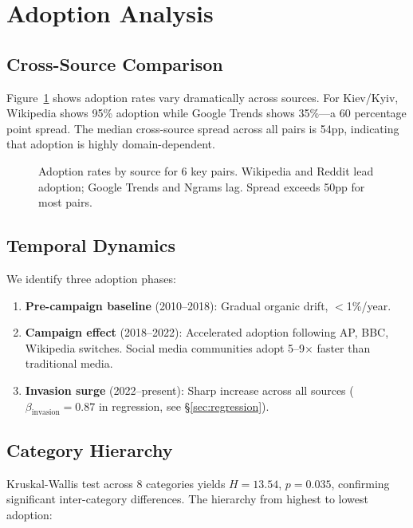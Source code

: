 \documentclass{article}
\begin{document}
\section{Adoption Analysis}
\label{sec:adoption}

\subsection{Cross-Source Comparison}

Figure~\ref{fig:adoption-spread} shows adoption rates vary dramatically across sources. For Kiev/Kyiv, Wikipedia shows 95\% adoption while Google Trends shows 35\%---a 60 percentage point spread. The median cross-source spread across all pairs is 54pp, indicating that adoption is highly domain-dependent.

\begin{figure}[t]
\centering
{}
\caption{Adoption rates by source for 6 key pairs. Wikipedia and Reddit lead adoption; Google Trends and Ngrams lag. Spread exceeds 50pp for most pairs.}
\label{fig:adoption-spread}
\end{figure}

\subsection{Temporal Dynamics}

We identify three adoption phases:

\begin{enumerate}
\item \textbf{Pre-campaign baseline} (2010--2018): Gradual organic drift, $<$1\%/year.
\item \textbf{Campaign effect} (2018--2022): Accelerated adoption following AP, BBC, Wikipedia switches. Social media communities adopt 5--9$\times$ faster than traditional media.
\item \textbf{Invasion surge} (2022--present): Sharp increase across all sources ($\beta_{\text{invasion}} = 0.87$ in regression, see \S\ref{sec:regression}).
\end{enumerate}

\subsection{Category Hierarchy}

Kruskal-Wallis test across 8 categories yields $H = 13.54$, $p = 0.035$, confirming significant inter-category differences. The hierarchy from highest to lowest adoption:
\end{document}
